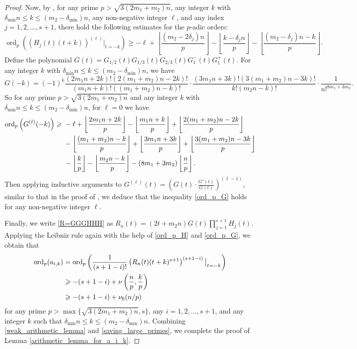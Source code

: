\documentclass[11pt]{amsart}
\numberwithin{equation}{section}
\begin{document}
\begin{proof}
Now, by \cite[Lemma 18]{Zu04}, for any prime $p > \sqrt{3(2m_1+m_2)n}$, any integer $k$ with $\delta_{\min}n \leqslant k \leqslant (m_2-\delta_{\min})n$, any non-negative integer $\ell$, and any index $j=1,2,\ldots,s+1$, there hold the following estimates for the $p$-adic orders:
\begin{equation}\label{ord_p_H}
\operatorname{ord}_{p}\left( \left( H_j(t)(t+k)  \right)^{(\ell)} \big|_{t=-k} \right) \geqslant -\ell + \left\lfloor \frac{(m_2 - 2\delta_j)n}{p} \right\rfloor - \left\lfloor \frac{k-\delta_{j}n}{p} \right\rfloor - \left\lfloor \frac{(m_2-\delta_j)n - k}{p} \right\rfloor.
\end{equation}
Define the polynomial $G(t) = G_{1/2}(t)G_{1/3}(t)G_{2/3}(t)G_{1}^{-}(t)G_1^{+}(t)$. For any integer $k$ with $\delta_{\min}n \leqslant k \leqslant (m_2-\delta_{\min})n$, we have
\[ G(-k) = (-1)^k \frac{(2m_1n+2k)!(2(m_1+m_2)n-2k)!}{(m_1n+k)!((m_1+m_2)n-k)!} \cdot \frac{(3m_1n+3k)!(3(m_1+m_2)n-3k)!}{k!(m_2n-k)!} \cdot \frac{1}{n!^{8m_1+3m_2}}. \]
So for any prime $p > \sqrt{3(2m_1+m_2)n}$ and any integer $k$ with $\delta_{\min}n \leqslant k \leqslant (m_2-\delta_{\min})n$, for $\ell = 0$ we have
\begin{align}\label{ord_p_G}
\operatorname{ord}_{p}\left( G^{(\ell)}(-k) \right) \geqslant ~& - \ell +  \left\lfloor \frac{2m_{1}n + 2k}{p} \right\rfloor - \left\lfloor \frac{m_{1}n + k}{p} \right\rfloor + \left\lfloor \frac{2(m_1+m_2)n - 2k}{p} \right\rfloor   \notag  \\
&- \left\lfloor \frac{(m_1+m_2)n - k}{p} \right\rfloor +  \left\lfloor \frac{3m_{1}n+3k}{p} \right\rfloor + \left\lfloor \frac{3(m_1+m_2)n - 3k}{p} \right\rfloor \notag \\
&- \left\lfloor \frac{k}{p} \right\rfloor - \left\lfloor \frac{m_2n-k}{p} \right\rfloor - (8m_1+3m_2)\left\lfloor \frac{n}{p} \right\rfloor .
\end{align}
Then applying inductive arguments to $G^{(\ell)}(t) = \left(G(t) \cdot \frac{G'(t)}{G(t)} \right)^{(\ell-1)}$, similar to that in the proof of \cite[Lemma 17]{Zu04}, we deduce that the inequality \eqref{ord_p_G} holds for any non-negative integer $\ell$.

Finally, we write \eqref{R=GGGHHH} as $R_n(t) = (2t+m_2n) G(t) \prod_{j=1}^{s+1} H_j(t)$. Applying the Leibniz rule again with the help of \eqref{ord_p_H} and \eqref{ord_p_G}, we obtain that
\begin{align}\label{saving_large_primes}
\operatorname{ord}_{p} (a_{i,k}) &= \operatorname{ord}_{p} \left(  \frac{1}{(s+1-i)!} \left( R_n(t)(t+k)^{s+1} \right)^{(s+1-i)} \big|_{t=-k} \right) \notag \\
&\geqslant -(s+1-i) + \nu\left( \frac{n}{p},\frac{k}{p} \right) \notag \\
&\geqslant -(s+1-i) + \nu_0(n/p)
\end{align}
for any prime $p > \max\{ \sqrt{3(2m_1+m_2)n},s \}$, any $i=1,2,\ldots,s+1$, and any integer $k$ such that $\delta_{\min}n \leqslant k \leqslant (m_2-\delta_{\min})n$. Combining \eqref{weak_arithmetic_lemma} and \eqref{saving_large_primes}, we complete the proof of Lemma \ref{arithmetic_lemma_for_a_i_k}.
\end{proof}
\end{document}
